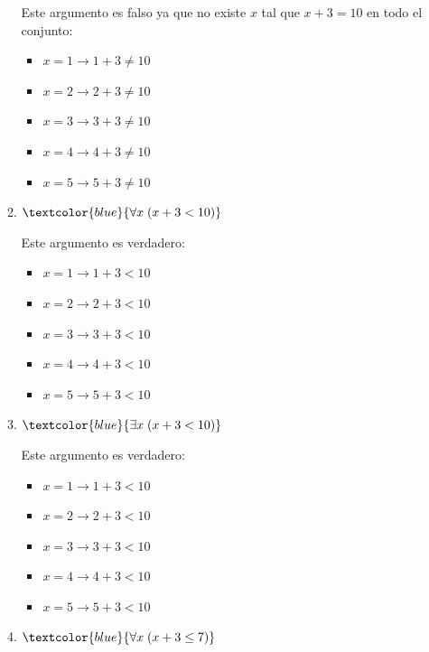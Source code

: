 \documentclass{article}
\newcommand{\db}[1]{\textcolor{blue}{#1}}
\begin{document}
\begin{enumerate}[label=\color{red}\textbf{\arabic*)}, leftmargin=*]
\begin{enumerate}[label=\color{red}\alph*)]
            Este argumento es falso ya que no existe $x$ tal que $x+3=10$ en todo el conjunto:
            \begin{itemize}[label=$-$]
                  \item $x=1\longrightarrow 1+3\neq10$
                  \item $x=2\longrightarrow 2+3\neq10$
                  \item $x=3\longrightarrow 3+3\neq10$
                  \item $x=4\longrightarrow 4+3\neq10$
                  \item $x=5\longrightarrow 5+3\neq10$
            \end{itemize}
            \item $\db{\forall x\;(x+3<10)}$
            
            Este argumento es verdadero:
            \begin{itemize}[label=$-$]
                  \item $x=1\longrightarrow 1+3<10$
                  \item $x=2\longrightarrow 2+3<10$
                  \item $x=3\longrightarrow 3+3<10$
                  \item $x=4\longrightarrow 4+3<10$
                  \item $x=5\longrightarrow 5+3<10$
            \end{itemize}
            \item $\db{\exists x\;(x+3<10)}$
            
            Este argumento es verdadero:
            \begin{itemize}[label=$-$]
                  \item $x=1\longrightarrow 1+3<10$
                  \item $x=2\longrightarrow 2+3<10$
                  \item $x=3\longrightarrow 3+3<10$
                  \item $x=4\longrightarrow 4+3<10$
                  \item $x=5\longrightarrow 5+3<10$
            \end{itemize}
            \item $\db{\forall x\;(x+3\le7)}$
            

\end{enumerate}
\end{enumerate}
\end{document}
